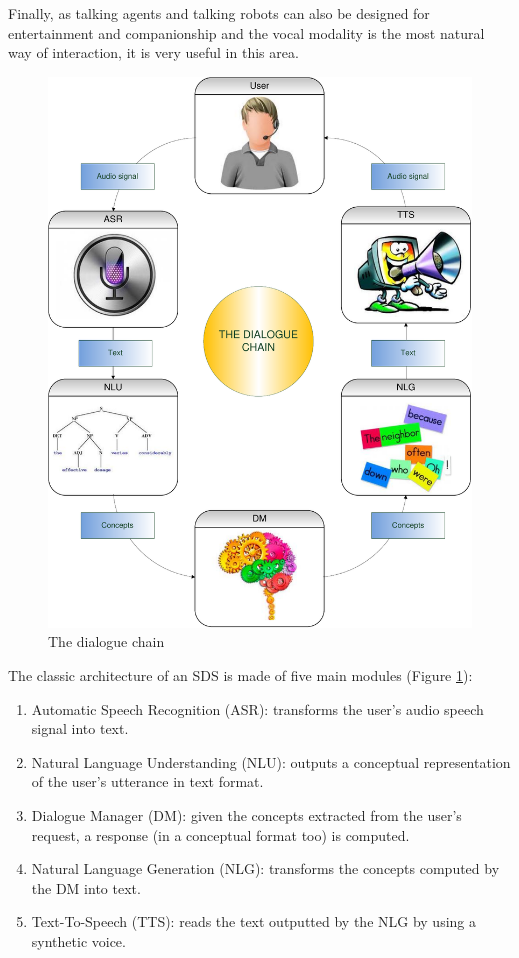         Finally, as talking agents and talking robots can also be designed for entertainment and companionship \cite{Sidner2013} and the vocal modality is the most natural way of interaction, it is very useful in this area.

		
		\begin{figure}
			\centering
			\includegraphics[scale=0.8]{figures/DialogueChain.pdf}
			\caption{The dialogue chain}
			\label{fig:dialchain}
		\end{figure}

		The classic architecture of an SDS is made of five main modules (Figure \ref{fig:dialchain}):
		\begin{enumerate}
			\item Automatic Speech Recognition (ASR): transforms the user's audio speech signal into text.
				\item Natural Language Understanding (NLU): outputs a conceptual representation of the user's utterance in text format.
				\item Dialogue Manager (DM): given the concepts extracted from the user's request, a response (in a conceptual format too) is computed.
				\item Natural Language Generation (NLG): transforms the concepts computed by the DM into text.
				\item Text-To-Speech (TTS): reads the text outputted by the NLG by using a synthetic voice.
		\end{enumerate}

